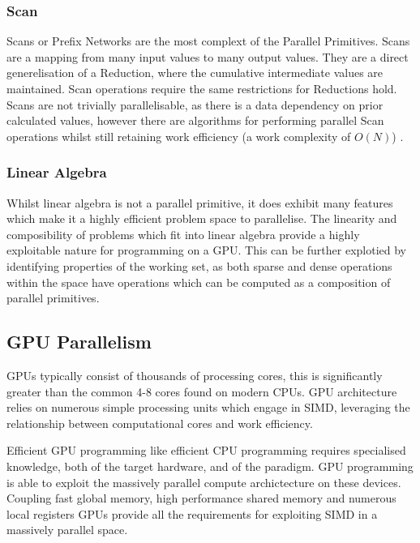 \subsubsection{Scan}

Scans or Prefix Networks are the most complext of the Parallel Primitives. Scans are a mapping from
many input values to many output values. They are a direct generelisation of a Reduction, where the
cumulative intermediate values are maintained. Scan operations require the same restrictions for
Reductions hold. Scans are not trivially parallelisable, as there is a data dependency on
prior calculated values, however there are algorithms for performing parallel Scan operations whilst
still retaining work efficiency (a work complexity of $ O(N) $) \cite{ScanOp}.

\subsubsection{Linear Algebra}
Whilst linear algebra is not a parallel primitive, it does exhibit many features which make it a
highly efficient problem space to parallelise. The linearity and composibility of problems which fit
into linear algebra provide a highly exploitable nature for programming on a GPU. This can be
further explotied by identifying properties of the working set, as both sparse and dense operations
within the space have operations which can be computed as a composition of parallel
primitives\cite{gallivan1990parallel}.

\subsection{GPU Parallelism}
GPUs typically consist of thousands of processing cores, this is significantly greater than the
common 4-8 cores found on modern CPUs. GPU architecture relies on numerous simple processing units
which engage in SIMD, leveraging the relationship between computational cores and work efficiency.


Efficient GPU programming like efficient CPU programming requires specialised knowledge, both of the
target hardware, and of the paradigm. GPU programming is able to exploit the massively parallel
compute archictecture on these devices. Coupling fast global memory, high performance shared memory
and numerous local registers GPUs provide all the requirements for exploiting SIMD in a massively
parallel space.




